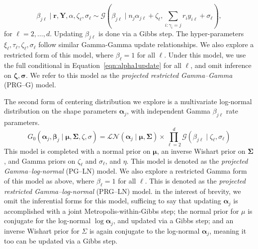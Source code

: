 \begin{equation}
    \beta_{j\ell}\mid\bm{r},\bm{Y},\alpha,\zeta_{\ell},\sigma_{\ell} \sim \mathcal{G}\left(\beta_{j\ell}\mid n_j\alpha_{j\ell} + \zeta_\ell, \sum_{i:\gamma_i = j}r_iy_{i\ell} + \sigma_{\ell}\right),
\end{equation}
for $\ell = 2,\ldots, d$.  Updating $\beta_{j\ell}$ is done via a Gibbs step.  The hyper-parameters $\xi_{\ell},\tau_{\ell},\zeta_{\ell},\sigma_{\ell}$ follow similar Gamma-Gamma update relationships.  We also explore a restricted form of this model, where $\beta_{\ell} = 1$ for all $\ell$.  Under this model, we use the full conditional in Equation~\ref{eqn:alpha1update} for all $\ell$, and omit inference on $\bm{\zeta},\bm{\sigma}$.  We refer to this model as the \emph{projected restricted Gamma--Gamma} (PRG--G) model.

The second form of centering distribution we explore is a multivariate log-normal distribution on the shape parameters $\bm{\alpha}_j$, with independent Gamma $\beta_{j\ell}$ rate parameters.  
\begin{equation}
    G_0\left(\bm{\alpha}_j,\bm{\beta}_j\mid\bm{\mu},\bm{\Sigma},\zeta,\sigma\right) = \mathcal{LN}\left(\bm{\alpha}_j\mid\bm{\mu},\bm{\Sigma}\right)\times\prod_{\ell = 2}^d\mathcal{G}\left(\beta_{j\ell}\mid\zeta_{\ell},\sigma_{\ell}\right)
\end{equation}
This model is completed with a normal prior on $\bm{\mu}$, an inverse Wishart prior on $\bm{\Sigma}$, and Gamma priors on $\zeta_{\ell}$ and $\sigma_{\ell}$, and $\eta$.  This model is denoted as the \emph{projected Gamma--log-normal} (PG--LN) model.  We also explore a restricted Gamma form of this model as above, where $\beta_{\ell} = 1$ for all $\ell$.  This is denoted as the \emph{projected restricted Gamma--log-normal} (PRG--LN) model.  in the interest of brevity, we omit the inferential forms for this model, sufficing to say that updating $\bm{\alpha}_j$ is accomplished with a joint Metropolis-within-Gibbs step; the normal prior for $\mu$ is conjugate for the log-normal $\log\bm{\alpha}_j$, and updated via a Gibbs step; and an inverse Wishart prior for $\Sigma$ is again conjugate to the log-normal $\bm{\alpha}_j$, meaning it too can be updated via a Gibbs step.

